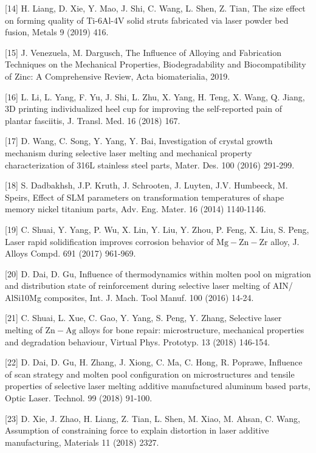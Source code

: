 \documentclass[10pt]{article}
\begin{document}
[14] H. Liang, D. Xie, Y. Mao, J. Shi, C. Wang, L. Shen, Z. Tian, The size effect on forming quality of Ti-6Al-4V solid struts fabricated via laser powder bed fusion, Metals 9 (2019) 416.

[15] J. Venezuela, M. Dargusch, The Influence of Alloying and Fabrication Techniques on the Mechanical Properties, Biodegradability and Biocompatibility of Zinc: A Comprehensive Review, Acta biomaterialia, 2019.

[16] L. Li, L. Yang, F. Yu, J. Shi, L. Zhu, X. Yang, H. Teng, X. Wang, Q. Jiang, 3D printing individualized heel cup for improving the self-reported pain of plantar fasciitis, J. Transl. Med. 16 (2018) 167.

[17] D. Wang, C. Song, Y. Yang, Y. Bai, Investigation of crystal growth mechanism during selective laser melting and mechanical property characterization of 316L stainless steel parts, Mater. Des. 100 (2016) 291-299.

[18] S. Dadbakhsh, J.P. Kruth, J. Schrooten, J. Luyten, J.V. Humbeeck, M. Speirs, Effect of SLM parameters on transformation temperatures of shape memory nickel titanium parts, Adv. Eng. Mater. 16 (2014) 1140-1146.

[19] C. Shuai, Y. Yang, P. Wu, X. Lin, Y. Liu, Y. Zhou, P. Feng, X. Liu, S. Peng, Laser rapid solidification improves corrosion behavior of $\mathrm{Mg}-\mathrm{Zn}-\mathrm{Zr}$ alloy, J. Alloys Compd. 691 (2017) 961-969.

[20] D. Dai, D. Gu, Influence of thermodynamics within molten pool on migration and distribution state of reinforcement during selective laser melting of AIN/ AlSi10Mg composites, Int. J. Mach. Tool Manuf. 100 (2016) 14-24.

[21] C. Shuai, L. Xue, C. Gao, Y. Yang, S. Peng, Y. Zhang, Selective laser melting of $\mathrm{Zn}-\mathrm{Ag}$ alloys for bone repair: microstructure, mechanical properties and degradation behaviour, Virtual Phys. Prototyp. 13 (2018) 146-154.

[22] D. Dai, D. Gu, H. Zhang, J. Xiong, C. Ma, C. Hong, R. Poprawe, Influence of scan strategy and molten pool configuration on microstructures and tensile properties of selective laser melting additive manufactured aluminum based parts, Optic Laser. Technol. 99 (2018) 91-100.

[23] D. Xie, J. Zhao, H. Liang, Z. Tian, L. Shen, M. Xiao, M. Ahsan, C. Wang, Assumption of constraining force to explain distortion in laser additive manufacturing, Materials 11 (2018) 2327.
\end{document}
